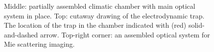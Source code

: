 \documentclass[preprint,review,12pt,dvips]{elsarticle}
\begin{document}
\begin{figure}[h!t!b!]
\begin{center}
\end{center}
\caption{Middle: partially assembled climatic chamber with main optical system in place. Top: cutaway drawing of the
electrodynamic trap. The location of the trap in the chamber indicated with (red) solid-and-dashed arrow. Top-right
corner: an assembled optical system for Mie scattering imaging.} \label{setup}
\end{figure}
\end{document}
